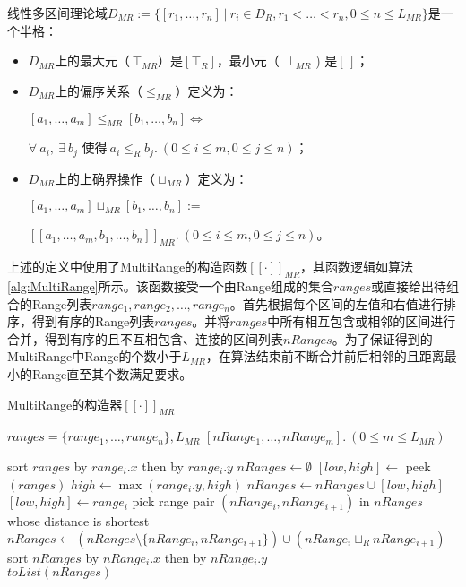 \begin{definition}
	线性多区间理论域$ D_{MR}  := \{ [r_1, \dots, r_n] \ | \ r_i \in D_R,  r_1 < \dots < r_n, 0 \le n \le L_{MR} \}$是一个半格：
	\begin{itemize}
		\item $ D_{MR} $上的最大元（$\, \top_{MR} $）是$ [\top_R] $，最小元（\, $ \bot_{MR} $ ) 是$ [\,] $；
		
		\item $ D_{MR} $上的偏序关系（$ \le_{MR} $）定义为：\\
			\centerline{$[a_1, \dots, a_m] \le_{MR} [b_1, \dots, b_n] \iff$}
			\centerline{$ \forall \ a_i, \ \exists\  b_j \text{ 使得} \ a_i \le_R b_j .\  (0 \le i \le m, 0 \le j \le n)$；}
			
		\item $ D_{MR} $上的上确界操作（$ \sqcup_{MR} $）定义为：\\
			\centerline{$ [a_1, \dots, a_m] \sqcup_{MR} [b_1, \dots, b_n]  := $}
			\centerline{$ [[a_1, \dots, a_m, b_1, \dots, b_n]]_{MR} .\  (0 \le i \le m, 0 \le j \le n)$。}
	\end{itemize}
	
\end{definition}

上述的定义中使用了MultiRange的构造函数$ [[\cdot]]_{MR} $，其函数逻辑如算法\ref{alg:MultiRange}所示。该函数接受一个由Range组成的集合$ ranges $或直接给出待组合的Range列表$ range_1, range_2, \dots, range_n $。首先根据每个区间的左值和右值进行排序，得到有序的Range列表$ ranges $。并将$ ranges $中所有相互包含或相邻的区间进行合并，得到有序的且不互相包含、连接的区间列表$ nRanges $。为了保证得到的MultiRange中Range的个数小于$ L_{MR} $，在算法结束前不断合并前后相邻的且距离最小的Range直至其个数满足要求。

\begin{breakablealgorithm}
	\caption{MultiRange的构造器$ [[\cdot]]_{MR} $}
	\label{alg:MultiRange}
	\begin{algorithmic}[1]
		
		\Require $ ranges = \{range_1, \dots, range_n\}, L_{MR} $
		\Ensure $ [nRange_1, \dots, nRange_m]. \ (0 \le m \le L_{MR})$
		
		\State sort $ ranges $ by $ range_{i}.x $ then by $ range_{i}.y $
		\State $ nRanges \gets \emptyset$
		\State $ [low, high] \gets$ peek$ (ranges) $
				\State $ high \gets \max(range_i.y, high) $
			\Else
				\State $ nRanges \gets nRanges \cup [low, high] $
				\State $ [low, high] \gets range_i $
			\EndIf
		\EndFor
			\State pick range pair $ (nRange_i, nRange_{i+1} )$ in $ nRanges $ whose distance is shortest
			\State $ nRanges \gets (nRanges \setminus\{nRange_i, nRange_{i+1}\}) \cup (nRange_i \sqcup_R nRange_{i+1}) $
			\State sort $ nRanges $ by $ nRange_{i}.x $ then by $ nRange_{i}.y $
		\EndWhile
		\\\Return $ toList(nRanges) $
		
	\end{algorithmic}
\end{breakablealgorithm}

